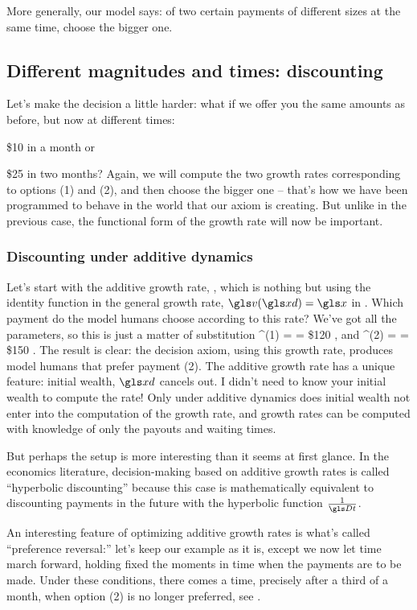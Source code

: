 More generally, our model says: of two certain payments of different sizes at the same time, choose the bigger one.

\subsection{Different magnitudes and times: discounting}
Let's make the decision a little harder: what if we offer you the same amounts as before, but now at different times:
\bi
\item[(1)] \$10 in a month or 
\item[(2)] \$25 in two months?
\ei
Again, we will compute the two growth rates corresponding to options (1) and (2), and then choose the bigger one -- that's how we have been programmed to behave in the world that our axiom is creating. But unlike in the previous case, the functional form of the growth rate will now be important. 

\subsubsection{Discounting under additive dynamics}

Let's start with the additive growth rate, , which is nothing but using the identity function in the general growth rate, $\gv(\xd)=\x$ in . Which payment do the model humans choose according to this rate? We've got all the parameters, so this is just a matter of substitution
\be
\gad^{(1)} = = \$120 ,
\ee
and
\be
\gad^{(2)} = = \$150 .
\ee
The result is clear: the decision axiom, using this growth rate, produces model humans that prefer payment (2).
The additive growth rate has a unique feature: initial wealth, $\xd$ cancels out. I didn't need to know your initial wealth to compute the rate! Only under additive dynamics does initial wealth not enter into the computation of the growth rate, and growth rates can be computed with knowledge of only the payouts and waiting times.

But perhaps the setup is more interesting than it seems at first glance.
In the economics literature, decision-making based on additive growth rates is called ``hyperbolic discounting'' because this case is mathematically equivalent to discounting payments in the future with the hyperbolic function $\frac{1}{\Dt}$.

An interesting feature of optimizing additive growth rates is what's called ``preference reversal:'' let's keep our example as it is, except we now let time march forward, holding fixed the moments in time when the payments are to be made. Under these conditions, there comes a time, precisely after a third of a month, when option (2) is no longer preferred, see .

